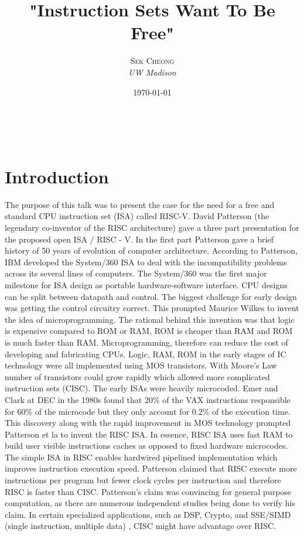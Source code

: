 \documentclass[a4paper, 11pt]{article} %
\title{\textbf{"Instruction Sets Want To Be Free"}} %
\author{\textsc{Sek Cheong} %
\\{\textit{UW Madison}}} %
\date{\today} %
\makeatletter
\renewcommand{\maketitle}{ %
\begin{flushright} %
{\LARGE\@title} %

\vspace{50pt} %

{\large\@author} %
\\\@date %

\vspace{40pt} %
\end{flushright}
}
\makeatother
\begin{document}
\maketitle %



\section*{Introduction}

The purpose of this talk was to present the case for the need for a free and standard CPU instruction set (ISA) called RISC-V. David Patterson (the legendary co-inventor of the RISC architecture) gave a three part presentation for the proposed open ISA / RISC - V. In the first part Patterson gave a brief history of 50 years of evolution of computer architecture. 
According to Patterson, IBM developed the System/360 ISA to deal with the incompatibility problems across its several lines of computers. The System/360 was the first major milestone for ISA design as portable hardware-software interface. CPU designs can be split between datapath and control. The biggest challenge for early design was getting the control circuitry correct.  This prompted Maurice Wilkes to invent the idea of microprogramming. The rational behind this invention was that logic is expensive compared to ROM or RAM, ROM is cheaper than RAM and ROM is much faster than RAM. Microprogramming, therefore can reduce the cost of developing and fabricating CPUs. Logic, RAM, ROM in the early stages of IC technology were all implemented using MOS transistors.  With Moore's Law number of transistors could grow rapidly which allowed more complicated instruction sets (CISC). 
The early ISAs were heavily microcoded. Emer and Clark at DEC in the 1980s found that 20\% of the VAX instructions responsible for 60\% of the microcode but they only account for 0.2\% of the execution time. This discovery along with the rapid improvement in MOS technology prompted Patterson et la to  invent the RISC ISA. In essence, RISC ISA uses fast RAM to build user visible instructions caches as opposed to fixed hardware microcodes. The simple ISA in RISC enables hardwired pipelined implementation which improves instruction execution speed. Patterson claimed that RISC execute more instructions per program but fewer clock cycles per instruction and therefore RISC is faster than CISC. Patterson's claim was convincing for general purpose computation, as there are  numerous independent studies being done to verify his claim. In certain specialized applications, such as DSP, Crypto, and SSE/SIMD (single instruction, multiple data) ,  CISC might have advantage over RISC.
\end{document}
